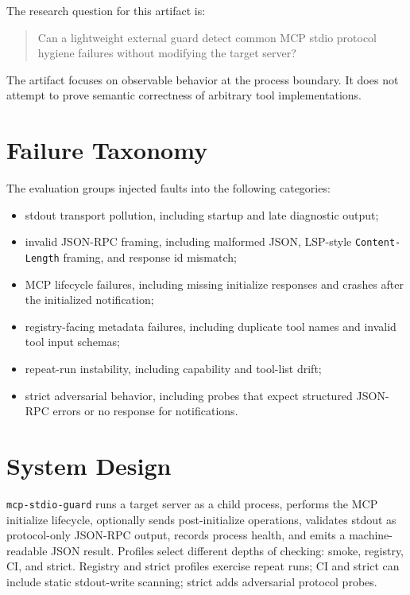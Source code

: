 \documentclass[10pt]{article}
\begin{document}
The research question for this artifact is:

\begin{quote}
Can a lightweight external guard detect common MCP stdio protocol hygiene
failures without modifying the target server?
\end{quote}

The artifact focuses on observable behavior at the process boundary. It does not
attempt to prove semantic correctness of arbitrary tool implementations.

\section{Failure Taxonomy}

The evaluation groups injected faults into the following categories:

\begin{itemize}
  \item stdout transport pollution, including startup and late diagnostic output;
  \item invalid JSON-RPC framing, including malformed JSON, LSP-style
        \texttt{Content-Length} framing, and response id mismatch;
  \item MCP lifecycle failures, including missing initialize responses and
        crashes after the initialized notification;
  \item registry-facing metadata failures, including duplicate tool names and
        invalid tool input schemas;
  \item repeat-run instability, including capability and tool-list drift;
  \item strict adversarial behavior, including probes that expect structured
        JSON-RPC errors or no response for notifications.
\end{itemize}

\section{System Design}

\texttt{mcp-stdio-guard} runs a target server as a child process, performs the
MCP initialize lifecycle, optionally sends post-initialize operations, validates
stdout as protocol-only JSON-RPC output, records process health, and emits a
machine-readable JSON result. Profiles select different depths of checking:
smoke, registry, CI, and strict. Registry and strict profiles exercise repeat
runs; CI and strict can include static stdout-write scanning; strict adds
adversarial protocol probes.
\end{document}
